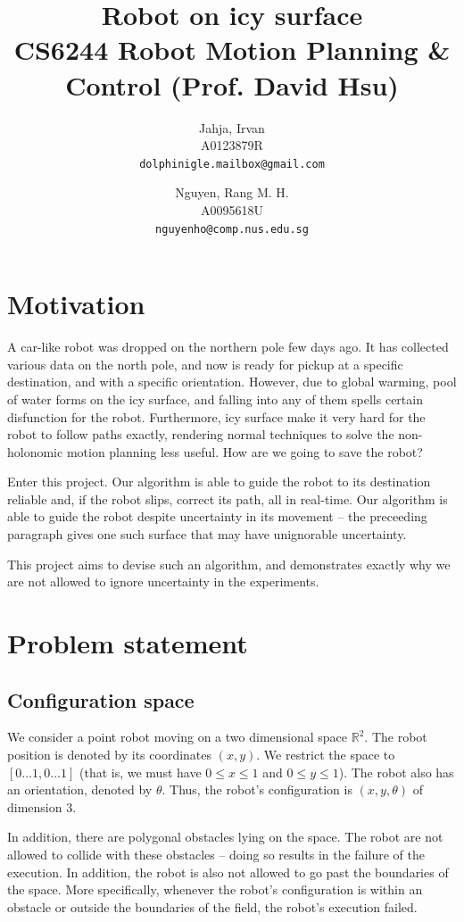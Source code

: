 \documentclass[10pt,a4paper,oneside]{article}
\title{Robot on icy surface \\ {\small CS6244 Robot Motion Planning \& Control (Prof. David Hsu)} }
\author{
  Jahja, Irvan\\
  {\small A0123879R} \\ \texttt{\small dolphinigle.mailbox@gmail.com}
  \and
  Nguyen, Rang M. H.\\
  {\small A0095618U} \\ \texttt{\small nguyenho@comp.nus.edu.sg}
}
\begin{document}
\maketitle

\section{Motivation}
A car-like robot was dropped on the northern pole few days ago. It has collected various
data on the north pole, and now is ready for pickup at a specific destination,
and with a specific orientation. However, due to global warming, pool of water
forms on the icy surface, and falling into any of them spells certain disfunction
for the robot. Furthermore, icy surface make it very hard for the robot to
follow paths exactly, rendering normal techniques to solve the non-holonomic
motion planning less useful. How are we going to save the robot?

Enter this project. Our algorithm is able to guide the robot to its destination
reliable and, if the robot slips, correct its path, all in real-time. Our algorithm
is able to guide the robot despite uncertainty in its movement -- the preceeding
paragraph gives one such surface that may have unignorable uncertainty.

This project aims to devise such an algorithm, and demonstrates exactly why
we are not allowed to ignore uncertainty in the experiments.

\section{Problem statement}

\subsection{Configuration space}
We consider a point robot moving on a two dimensional space $\mathbb{R}^2$.
The robot position is denoted by its coordinates $(x, y)$. We restrict the space
to $[0\ldots1, 0\ldots1]$ (that is, we must have $0 \le x \le 1$ and $0 \le y \le 1$).
The robot also has an orientation, denoted by $\theta$. Thus, the robot's
configuration is $(x, y, \theta)$ of dimension $3$.

In addition, there are polygonal obstacles lying on the space. The robot
are not allowed to collide with these obstacles -- doing so results in the
failure of the execution. In addition, the robot is also not allowed to go
past the boundaries of the space. More specifically, whenever the robot's
configuration is within an obstacle or outside the boundaries of the field,
the robot's execution failed.
\end{document}
